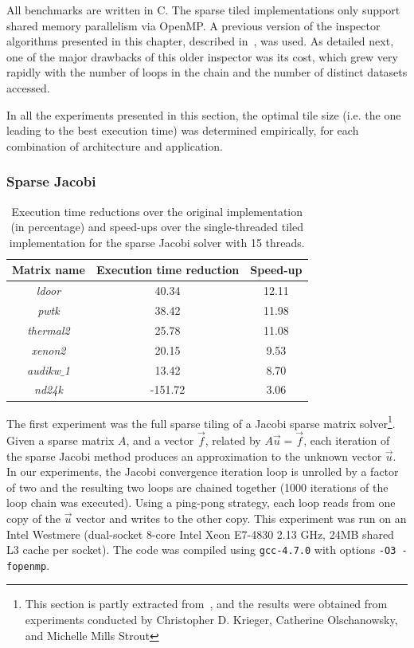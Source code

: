 All benchmarks are written in C. The sparse tiled implementations only support shared memory parallelism via OpenMP. A previous version of the inspector algorithms presented in this chapter, described in~\cite{st-paper}, was used. As detailed next, one of the major drawbacks of this older inspector was its cost, which grew very rapidly with the number of loops in the chain and the number of distinct datasets accessed. 

In all the experiments presented in this section, the optimal tile size (i.e. the one leading to the best execution time) was determined empirically, for each combination of architecture and application. 

\subsubsection{Sparse Jacobi}

\begin{table}[t]
\centering
\begin{tabulary}{1.0\columnwidth}{c | c | c}
\hline
Matrix name & Execution time reduction & Speed-up  \\
\hline
{\em ldoor} & 40.34 & 12.11 \\
{\em pwtk} & 38.42 & 11.98 \\
{\em thermal2} & 25.78 & 11.08 \\
{\em xenon2} & 20.15 & 9.53 \\
{\em audikw$\_$1} & 13.42 & 8.70 \\
{\em nd24k} & -151.72 & 3.06 \\
\hline
\end{tabulary}
\caption{Execution time reductions over the original implementation (in percentage) and speed-ups over the single-threaded tiled implementation for the sparse Jacobi solver with 15 threads.}
\label{table:st-jacobi}
\end{table}

The first experiment was the full sparse tiling of a Jacobi sparse matrix solver\footnote{This section is partly extracted from~\cite{st-paper}, and the results were obtained from experiments conducted by Christopher D. Krieger, Catherine Olschanowsky, and Michelle Mills Strout}. Given a sparse matrix $A$, and a vector $\vec{f}$, related by $A\vec{u}=\vec{f}$, each iteration of the sparse Jacobi method produces an approximation to the unknown vector $\vec{u}$. In our experiments, the Jacobi convergence iteration loop is unrolled by a factor of two and the resulting two loops are chained together (1000 iterations of the loop chain was executed). Using a ping-pong strategy, each loop reads from one copy of the $\vec{u}$ vector and writes to the other copy. This experiment was run on an Intel Westmere (dual-socket 8-core Intel Xeon E7-4830 2.13 GHz, 24MB shared L3 cache per socket). The code was compiled using {\tt gcc-4.7.0} with options {\tt -O3 -fopenmp}.

